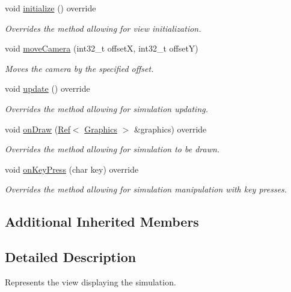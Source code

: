 \begin{DoxyCompactItemize}
void \mbox{\hyperlink{class_simulation_view_ad54da8596a97ae64ecf71b05038587fc}{initialize}} () override
\begin{DoxyCompactList}\small\item\em Overrides the method allowing for view initialization. \end{DoxyCompactList}\item 
void \mbox{\hyperlink{class_simulation_view_a04da3a65238673745d1aa7ed030c4780}{move\+Camera}} (int32\+\_\+t offsetX, int32\+\_\+t offsetY)
\begin{DoxyCompactList}\small\item\em Moves the camera by the specified offset. \end{DoxyCompactList}\item 
void \mbox{\hyperlink{class_simulation_view_a6e28ca1ab7e2805561d4c3ec9e6c7d7c}{update}} () override
\begin{DoxyCompactList}\small\item\em Overrides the method allowing for simulation updating. \end{DoxyCompactList}\item 
void \mbox{\hyperlink{class_simulation_view_a088d2d9c386b7202fe0d552323c137c3}{on\+Draw}} (\mbox{\hyperlink{class_ref}{Ref}}$<$ \mbox{\hyperlink{class_graphics}{Graphics}} $>$ \&graphics) override
\begin{DoxyCompactList}\small\item\em Overrides the method allowing for simulation to be drawn. \end{DoxyCompactList}\item 
void \mbox{\hyperlink{class_simulation_view_a3663c5246a999ab4f2ffd503c0e3d274}{on\+Key\+Press}} (char key) override
\begin{DoxyCompactList}\small\item\em Overrides the method allowing for simulation manipulation with key presses. \end{DoxyCompactList}\end{DoxyCompactItemize}
\subsection*{Additional Inherited Members}


\subsection{Detailed Description}
Represents the view displaying the simulation. 



